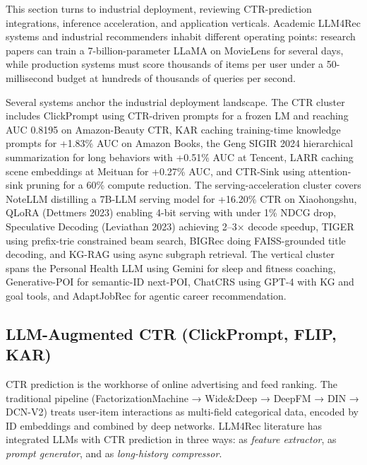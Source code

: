 \documentclass{article}
\begin{document}
This section turns to industrial deployment, reviewing CTR-prediction integrations, inference acceleration, and application verticals. Academic LLM4Rec systems and industrial recommenders inhabit different operating points: research papers can train a 7-billion-parameter LLaMA on MovieLens for several days, while production systems must score thousands of items per user under a 50-millisecond budget at hundreds of thousands of queries per second.

Several systems anchor the industrial deployment landscape. The CTR cluster includes ClickPrompt \citep{lin2023clickpromptctrmode} using CTR-driven prompts for a frozen LM and reaching AUC 0.8195 on Amazon-Beauty CTR, KAR \citep{xi2024towardsopenworldre} caching training-time knowledge prompts for +1.83\% AUC on Amazon Books, the Geng SIGIR 2024 hierarchical summarization for long behaviors with +0.51\% AUC at Tencent, LARR \citep{wan2024larrlargelanguagem} caching scene embeddings at Meituan for +0.27\% AUC, and CTR-Sink \citep{li2025grefergraphretriev} using attention-sink pruning for a 60\% compute reduction. The serving-acceleration cluster covers NoteLLM \citep{zhang2024textlikeencodingof} distilling a 7B-LLM serving model for +16.20\% CTR on Xiaohongshu, QLoRA (Dettmers 2023) enabling 4-bit serving with under 1\% NDCG drop, Speculative Decoding (Leviathan 2023) achieving 2--3× decode speedup, TIGER \citep{rajput2023recommendersystems} using prefix-trie constrained beam search, BIGRec \citep{bao2023arxiv2305004472023} doing FAISS-grounded title decoding, and KG-RAG \citep{wang2025knowledgegraphretr} using async subgraph retrieval. The vertical cluster spans the Personal Health LLM \citep{khasentino2025apersonalhealthlar} using Gemini for sleep and fitness coaching, Generative-POI \citep{wang2025knowledgegraphretr} for semantic-ID next-POI, ChatCRS \citep{li2025grefergraphretriev} using GPT-4 with KG and goal tools, and AdaptJobRec \citep{wang2025knowledgegraphretr} for agentic career recommendation.

\subsection{LLM-Augmented CTR (ClickPrompt, FLIP, KAR)}\label{llm-augmented-ctr-clickprompt-flip-kar}

CTR prediction is the workhorse of online advertising and feed ranking. The traditional pipeline (FactorizationMachine → Wide\&Deep → DeepFM → DIN → DCN-V2) treats user-item interactions as multi-field categorical data, encoded by ID embeddings and combined by deep networks. LLM4Rec literature has integrated LLMs with CTR prediction in three ways: as \emph{feature extractor}, as \emph{prompt generator}, and as \emph{long-history compressor}.
\end{document}
